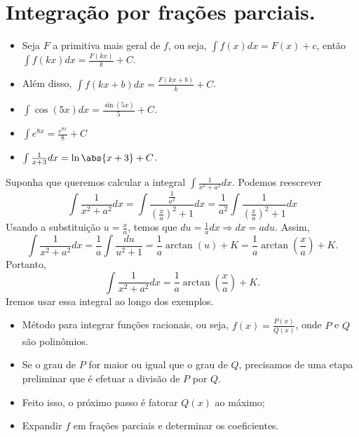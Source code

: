 \section{Integração por frações parciais.}

\begin{itemize}
  \item Seja $F$ a primitiva mais geral de $f$, ou seja,
        \(\int f(x)dx= F(x)+c\), então
        \(\int f(kx) dx= \frac{F(kx)}{k}+C\).
  \item Além disso, \(\int f(kx+b)dx= \frac{F(kx+b)}{k}+C\).
  \item \(\int \cos(5x) dx= \frac{\sin(5x)}{5}+C\).
  \item \(\int e^{8x}= \frac{e^{8x}}{8}+C\)
  \item \(\int \frac{1}{x+3}dx= \ln\abs{x+3}+C\).
\end{itemize}

Suponha que queremos calcular a integral $\int \frac{1}{x^2+a^2}dx$.
Podemos reescrever
\[
  \int \frac{1}{x^2+a^2}dx
  = \int \frac{\frac{1}{a^2}}{\left( \frac{x}{a}\right)^2+1 }dx
  = \frac{1}{a^2} \int \frac{1}{\left( \frac{x}{a}\right)^2+1} dx
\]
Usando a substituição $u= \frac{x}{a}$, temos que
$du=\frac{1}{a}dx \Longrightarrow dx=adu$.
Assim,
\[
  \int \frac{1}{x^2+a^2}dx
  = \frac{1}{a} \int \frac{du}{u^2+1}
  = \frac{1}{a} \arctan(u)+K
  =\frac{1}{a} \arctan\left(\frac{x}{a}\right)+K.
\]
Portanto,
\[
  \int \frac{1}{x^2+a^2}dx=\frac{1}{a} \arctan\left(\frac{x}{a}\right)+K.
\]
Iremos usar essa integral ao longo dos exemplos.

\begin{theory}
\begin{itemize}
  \item Método para integrar funções racionais, ou seja,
        $f(x)=\frac{P(x)}{Q(x)}$, onde $P$ e $Q$ são polinômios.

  \item Se o grau de $P$ for maior ou igual que o grau de $Q$,
        precisamos de uma etapa preliminar que é efetuar a divisão
        de $P$ por $Q$.

  \item Feito isso, o próximo passo é fatorar $Q(x)$ ao máximo;

  \item Expandir $f$ em frações parciais e determinar os coeficientes.
\end{itemize}
\end{theory}

